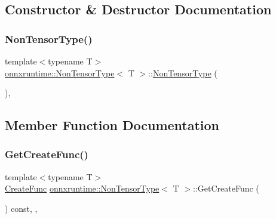 \subsection{Constructor \& Destructor Documentation}
\mbox{\label{classonnxruntime_1_1NonTensorType_a012356a54118f7ca3f429aa5c7ad38f2}} 
\subsubsection{\texorpdfstring{Non\+Tensor\+Type()}{NonTensorType()}}
{\footnotesize\ttfamily template$<$typename T$>$ \\
\mbox{\hyperlink{classonnxruntime_1_1NonTensorType}{onnxruntime\+::\+Non\+Tensor\+Type}}$<$ T $>$\+::\mbox{\hyperlink{classonnxruntime_1_1NonTensorType}{Non\+Tensor\+Type}} (\begin{DoxyParamCaption}{ }\end{DoxyParamCaption})\hspace{0.3cm}{\ttfamily [protected]}, {\ttfamily [default]}}



\subsection{Member Function Documentation}
\mbox{\label{classonnxruntime_1_1NonTensorType_aa42f5f4e125f8f0b385258cc6f27e9f8}} 
\subsubsection{\texorpdfstring{Get\+Create\+Func()}{GetCreateFunc()}}
{\footnotesize\ttfamily template$<$typename T$>$ \\
\mbox{\hyperlink{namespaceonnxruntime_a4e4e007092b50ccad0f64e24d7ac3c1e}{Create\+Func}} \mbox{\hyperlink{classonnxruntime_1_1NonTensorType}{onnxruntime\+::\+Non\+Tensor\+Type}}$<$ T $>$\+::Get\+Create\+Func (\begin{DoxyParamCaption}{ }\end{DoxyParamCaption}) const\hspace{0.3cm}{\ttfamily [inline]}, {\ttfamily [override]}, {\ttfamily [virtual]}}



